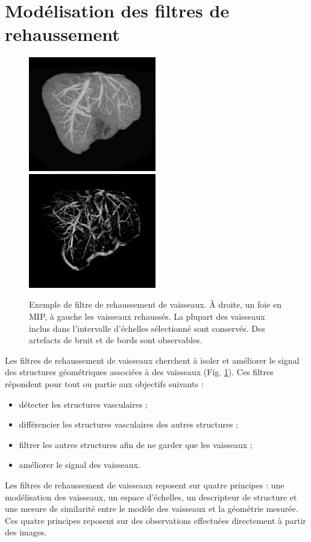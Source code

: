 \section{Modélisation des filtres de rehaussement}
  \begin{figure}[!ht]
    \centering
    \includegraphics[height=5cm]{Images/enhancement_part1.png}
    \includegraphics[height=5cm]{Images/enhancement_part2.png}
    \caption{Exemple de filtre de rehaussement de vaisseaux. À droite, un foie en MIP, à gauche les vaisseaux rehaussés. La plupart des vaisseaux inclus dans l'intervalle d'échelles sélectionné sont conservés. Des artefacts de bruit et de bords sont observables.}
    \label{fig:exemple_vesselness}
  \end{figure}
  Les filtres de rehaussement de vaisseaux cherchent à isoler et améliorer le signal des structures géométriques associées à des vaisseaux (Fig. \ref{fig:exemple_vesselness}). Ces filtres répondent pour tout ou partie aux objectifs suivants :
  \begin{itemize}
  \item détecter les structures vasculaires ;
  \item différencier les structures vasculaires des autres structures ;
  \item filtrer les autres structures afin de ne garder que les vaisseaux ;
  \item améliorer le signal des vaisseaux.
  \end{itemize}
Les filtres de rehaussement de vaisseaux reposent sur quatre principes : une modélisation des vaisseaux, un espace d'échelles, un descripteur de structure et une mesure de similarité entre le modèle des vaisseaux et la géométrie mesurée. Ces quatre principes reposent sur des observations effectuées directement à partir des images.
